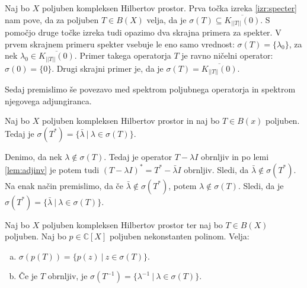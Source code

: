 \documentclass[mat2]{matdelo}
\newcommand{\C}{\mathbb{C}}
\newcommand{\abs}[1]{\ensuremath{\lvert #1 \rvert}}
\newcommand{\norm}[1]{\abs{\abs{#1}}}
\begin{document}
\begin{dokaz}
\begin{enumerate}[a)]
			\end{enumerate}
		\end{dokaz}
		
		\begin{opomba}
			\label{opomb:specprimeri} Naj bo $X$ poljuben kompleksen Hilbertov prostor. Prva točka izreka \ref{izr:specter} nam pove, da za poljuben $T\in B(X)$ velja, da je $\sigma(T)\subseteq \overline{K_{\norm{T}}(0)}$. S pomočjo druge točke izreka tudi opazimo dva skrajna primera za spekter. V prvem skrajnem primeru spekter vsebuje le eno samo vrednost: $\sigma(T)=\{\lambda_0\}$, za nek $\lambda_0\in\overline{K_{\norm{T}}(0)}$. Primer takega operatorja $T$ je ravno ničelni operator: $\sigma(0) = \{0\}$. Drugi skrajni primer je, da je $\sigma(T) = \overline{K_{\norm{T}}(0)}$.
		\end{opomba}
		
		Sedaj premislimo še povezavo med spektrom poljubnega operatorja in spektrom njegovega adjungiranca.
		
		\begin{lema}
			\label{lem:adjspec}
			Naj bo $X$ poljuben kompleksen Hilbertov prostor in naj bo $T\in B(x)$ poljuben. Tedaj je $\sigma(T^*)=\{\bar{\lambda}~|~\lambda\in\sigma(T)\}$.
		\end{lema}
		
		\begin{dokaz}
			Denimo, da nek $\lambda\notin\sigma(T)$. Tedaj je operator $T-\lambda I$ obrnljiv in po lemi \ref{lem:adjinv} je potem tudi $(T-\lambda I)^* = T^* - \bar{\lambda}I$ obrnljiv. Sledi, da $\bar{\lambda}\notin\sigma(T^*)$. Na enak način premislimo, da če $\bar{\lambda}\notin\sigma(T^*)$, potem $\lambda\notin\sigma(T)$. Sledi, da je $\sigma(T^*) =\{\bar{\lambda}~|~\lambda\in\sigma(T)\}$.
		\end{dokaz}
		
		\begin{izrek}
			\label{izr:polyspec}
			Naj bo $X$ poljuben kompleksen Hilbertov prostor ter naj bo $T\in B(X)$ poljuben. Naj bo $p\in\C[X]$ poljuben nekonstanten polinom. Velja: \begin{enumerate}[a)]
				\item $\sigma(p(T))=\{p(z)~|~z\in\sigma(T)\}$.
				\item Če je $T$ obrnljiv, je $\sigma(T^{-1})=\{\lambda^{-1}~|~\lambda\in\sigma(T)\}$.
			\end{enumerate}
		\end{izrek}
		
\end{document}
